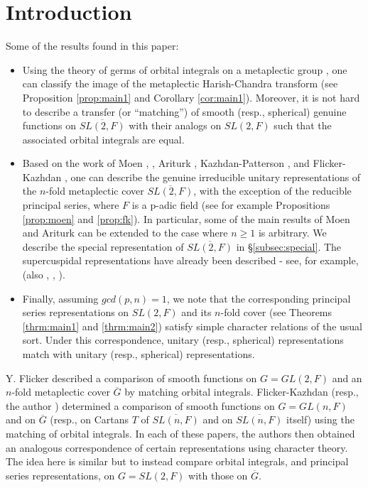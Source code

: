 \documentclass[twocolumn,10pt]{article}
\begin{document}
\section{Introduction}
Some of the results found in this paper:
\begin{itemize}
\item
Using the theory of germs of orbital integrals on a metaplectic group
\cite{V}, one can classify the image of the metaplectic Harish-Chandra
transform (see Proposition \ref{prop:main1}
and Corollary \ref{cor:main1}).
Moreover, it is not
hard to describe a transfer (or ``matching'') of 
smooth (resp., spherical)  genuine functions
on $\overline{SL(2,F)}$ with their
analogs on $SL(2,F)$ such that the
associated orbital integrals are equal.

\item
Based on the work of Moen \cite{Mo1}, \cite{Mo2},
Ariturk \cite{Ar}, Kazhdan-Patterson \cite{KP},
and Flicker-Kazhdan \cite{FK},
one can describe the genuine irreducible unitary
representations of the $n$-fold metaplectic cover
$\overline{SL(2,F)}$,
with the exception of the reducible principal series, 
where $F$ is a p-adic field (see for example
Propositions \ref{prop:moen} and \ref{prop:fk}).
In particular, some of the main results of Moen and 
Ariturk can be extended to the case where 
$n\geq 1$ is arbitrary. We describe
the special representation of $\overline{SL(2,F)}$
in \S \ref{subsec:special}. The supercuspidal representations
have already been described - see, 
for example, \cite{J3} (also \cite{M1}, \cite{M2}, \cite{J2}).

\item
Finally, assuming $gcd(p,n)=1$, we note that the 
corresponding principal
series representations on $SL(2,F)$ and its $n$-fold cover
(see Theorems \ref{thrm:main1} and \ref{thrm:main2})
satisfy simple character relations of the usual sort.
Under this correspondence, unitary (resp., spherical) representations match
with unitary (resp., spherical) representations. 
\end{itemize}

Y. Flicker \cite{F} described a comparison of smooth functions
on $G=GL(2,F)$ and an $n$-fold metaplectic
cover $\overline{G}$ by matching orbital integrals.
Flicker-Kazhdan \cite{FK} (resp., the author \cite{J1})
determined a comparison of smooth functions
on $G=GL(n,F)$ and on $\overline{G}$ 
(resp., on Cartans $T$ of $\overline{SL(n,F)}$ 
and on $\overline{SL(n,F)}$ itself) using the matching of
orbital integrals. In each of these papers, the authors then
obtained an analogous correspondence of
certain representations using character theory.
The idea here is similar but to instead compare orbital
integrals, and principal series representations,
on $G=SL(2,F)$ with those on $\overline{G}$.
\end{document}
